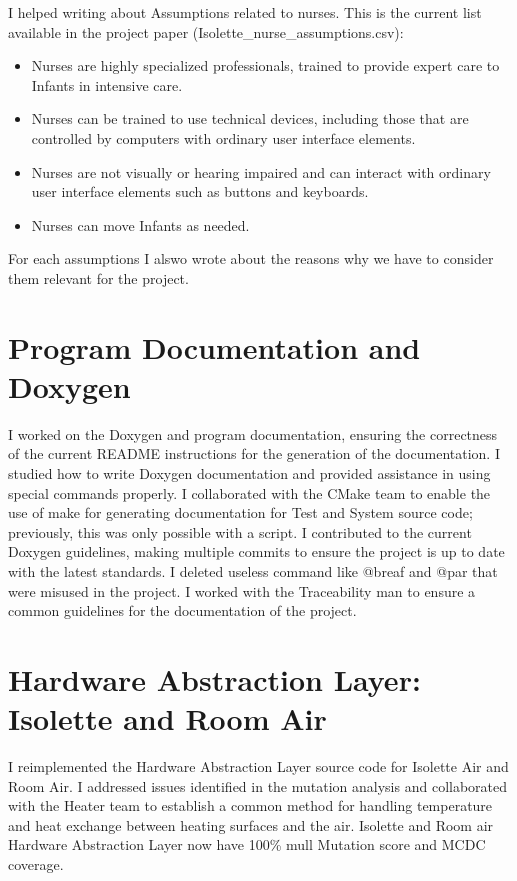 \documentclass[a4paper, 12pt]{article}
\begin{document}
I helped writing about Assumptions related to nurses. 
This is the current list available in the project paper (Isolette\_nurse\_assumptions.csv):

\begin{itemize}
    \item Nurses are highly specialized professionals, trained to provide expert care to Infants in intensive care.
    \item Nurses can be trained to use technical devices, including those that are controlled by computers with ordinary user interface elements.
    \item Nurses are not visually or hearing impaired and can interact with ordinary user interface elements such as buttons and keyboards.
    \item Nurses can move Infants as needed.
\end{itemize}

For each assumptions I alswo wrote about the reasons why we have to consider them relevant for the project.


\section{Program Documentation and Doxygen}

I worked on the Doxygen and program documentation, ensuring the correctness of the current README instructions for the generation of the documentation.
I studied how to write Doxygen documentation and provided assistance in using special commands properly. 
I collaborated with the CMake team to enable the use of make for generating documentation for Test and System source code; previously, this was only possible with a script. 
I contributed to the current Doxygen guidelines, making multiple commits to ensure the project is up to date with the latest standards.
I deleted useless command like @breaf and @par that were misused in the project.
I worked with the Traceability man to ensure a common guidelines for the documentation of the project.

\section{Hardware Abstraction Layer: Isolette and Room Air}

I reimplemented the Hardware Abstraction Layer source code for Isolette Air and Room Air. I addressed issues identified in the mutation analysis and collaborated with the Heater team to establish a common method for handling temperature and heat exchange between heating surfaces and the air.
Isolette and Room air Hardware Abstraction Layer now have 100\% mull Mutation score and MCDC coverage.
\end{document}
